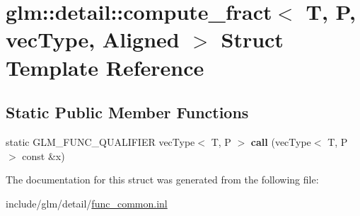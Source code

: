\hypertarget{structglm_1_1detail_1_1compute__fract}{}\section{glm\+:\+:detail\+:\+:compute\+\_\+fract$<$ T, P, vec\+Type, Aligned $>$ Struct Template Reference}
\label{structglm_1_1detail_1_1compute__fract}
\subsection*{Static Public Member Functions}
\begin{DoxyCompactItemize}
\item 
\mbox{\label{structglm_1_1detail_1_1compute__fract_a038503e0f1c7ac4e952cdefd055c32dd}} 
static G\+L\+M\+\_\+\+F\+U\+N\+C\+\_\+\+Q\+U\+A\+L\+I\+F\+I\+ER vec\+Type$<$ T, P $>$ {\bfseries call} (vec\+Type$<$ T, P $>$ const \&x)
\end{DoxyCompactItemize}


The documentation for this struct was generated from the following file\+:\begin{DoxyCompactItemize}
\item 
include/glm/detail/\hyperlink{func__common_8inl}{func\+\_\+common.\+inl}\end{DoxyCompactItemize}
